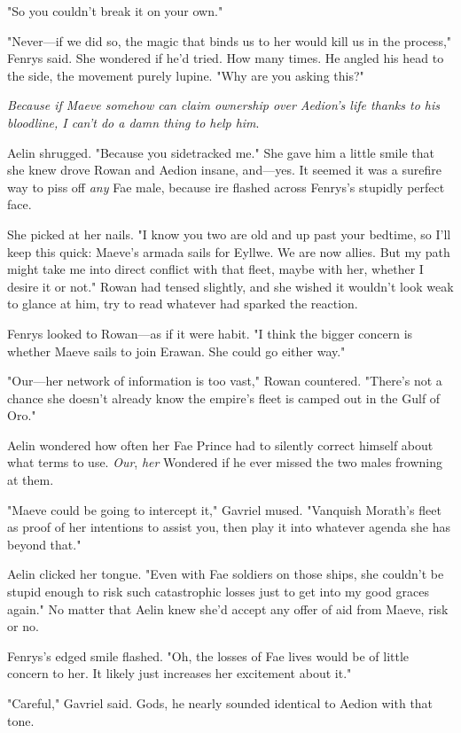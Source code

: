 "So you couldn't break it on your own."

"Never---if we did so, the magic that binds us to her would kill us in the process," Fenrys said.
She wondered if he'd tried.
How many times.
He angled his head to the side, the movement purely lupine.
"Why are you asking this?"

\emph{Because if Maeve somehow can claim ownership over Aedion's life thanks to his bloodline, I can't do a damn thing to help him}.

Aelin shrugged.
"Because you sidetracked me."
She gave him a little smile that she knew drove Rowan and Aedion insane, and---yes.
It seemed it was a surefire way to piss off \emph{any} Fae male, because ire flashed across Fenrys's stupidly perfect face.

She picked at her nails.
"I know you two are old and up past your bedtime, so I'll keep this quick: Maeve's armada sails for Eyllwe.
We are now allies.
But my path might take me into direct conflict with that fleet, maybe with her, whether I desire it or not."
Rowan had tensed slightly, and she wished it wouldn't look weak to glance at him, try to read whatever had sparked the reaction.

Fenrys looked to Rowan---as if it were habit.
"I think the bigger concern is whether Maeve sails to join Erawan.
She could go either way."

"Our---her network of information is too vast," Rowan countered.
"There's not a chance she doesn't already know the empire's fleet is camped out in the Gulf of Oro."

Aelin wondered how often her Fae Prince had to silently correct himself about what terms to use.
\emph{Our}, \emph{her}  Wondered if he ever missed the two males frowning at them.

"Maeve could be going to intercept it," Gavriel mused.
"Vanquish Morath's fleet as proof of her intentions to assist you, then 
play it into whatever agenda she has beyond that."

Aelin clicked her tongue.
"Even with Fae soldiers on those ships, she couldn't be stupid enough to risk such catastrophic losses just to get into my good graces again."
No matter that Aelin knew she'd accept any offer of aid from Maeve, risk or no.

Fenrys's edged smile flashed.
"Oh, the losses of Fae lives would be of little concern to her.
It likely just increases her excitement about it."

"Careful," Gavriel said.
Gods, he nearly sounded identical to Aedion with that tone.

